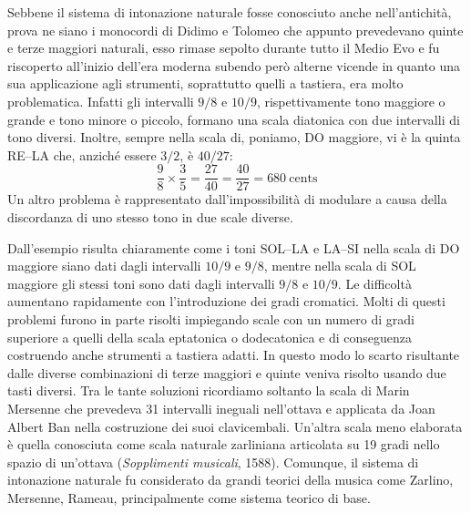 Sebbene il sistema di intonazione naturale fosse conosciuto anche
nell'antichità, prova ne siano i monocordi di Didimo e Tolomeo che appunto
prevedevano quinte e terze maggiori naturali, esso rimase sepolto durante tutto
il Medio Evo e fu riscoperto all'inizio dell'era moderna subendo però alterne
vicende in quanto una sua applicazione agli strumenti, soprattutto quelli a
tastiera, era molto problematica. Infatti gli intervalli $9/8$ e $10/9$,
rispettivamente tono maggiore o grande e tono minore o piccolo, formano una
scala diatonica con due intervalli di tono diversi. Inoltre, sempre nella scala
di, poniamo, DO maggiore, vi è la quinta RE--LA che, anziché essere $3/2$, è
$40/27$:
\[
  \frac{9}{8} \times \frac{3}{5} = \frac{27}{40} = \frac{40}{27} = 680~\text{cents}
\]
Un altro problema è rappresentato dall'impossibilità di modulare a causa della
discordanza di uno stesso tono in due scale diverse.

\begin{center}\small
{}
\end{center}

Dall'esempio risulta chiaramente come i toni SOL--LA e LA--SI nella scala di DO
maggiore siano dati dagli intervalli $10/9$ e $9/8$, mentre nella scala di SOL
maggiore gli stessi toni sono dati dagli intervalli $9/8$ e $10/9$. Le
difficoltà aumentano rapidamente con l'introduzione dei gradi cromatici. Molti
di questi problemi furono in parte risolti impiegando scale con un numero di
gradi superiore a quelli della scala eptatonica o dodecatonica e di conseguenza
costruendo anche strumenti a tastiera adatti. In questo modo lo scarto
risultante dalle diverse combinazioni di terze maggiori e quinte veniva risolto
usando due tasti diversi. Tra le tante soluzioni ricordiamo soltanto la scala di
Marin Mersenne che prevedeva 31 intervalli ineguali nell'ottava e applicata da
Joan Albert Ban nella costruzione dei suoi clavicembali. Un'altra scala meno
elaborata è quella conosciuta come scala naturale zarliniana articolata su 19
gradi nello spazio di un'ottava (\emph{Sopplimenti musicali}, 1588). Comunque,
il sistema di intonazione naturale fu considerato da grandi teorici della musica
come Zarlino, Mersenne, Rameau, principalmente come sistema teorico di base.

